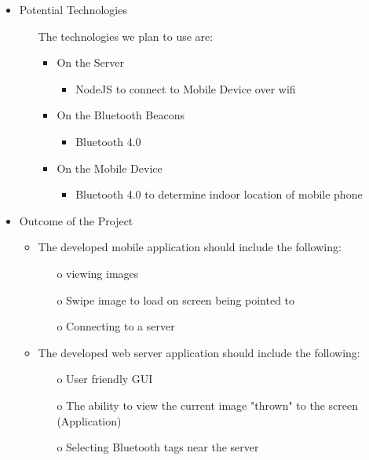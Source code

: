 \begin{itemize}
	\item Potential Technologies
	\begin{itemize}
		\item[] The technologies we plan to use are:
		\begin{itemize}
			\item On the Server
			\begin{itemize}
				\item NodeJS to connect to Mobile Device over wifi
			\end{itemize}
			\item On the Bluetooth Beacons
			\begin{itemize}
				\item Bluetooth 4.0 
			\end{itemize}
			\item On the Mobile Device
			\begin{itemize}
				\item Bluetooth 4.0 to determine indoor location of mobile phone
				
			\end{itemize}
		\end{itemize}
	\end{itemize}
	
	\item Outcome of the Project
	\begin{itemize}
		\item The developed mobile application should include the following:
		\begin{itemize}
			\item[o] viewing images
			\item[o] Swipe image to load on screen being pointed to
			\item[o] Connecting to a server
			
		\end{itemize}
		
		\item The developed web server application should include the following:
		\begin{itemize}
			\item [o] User friendly GUI
			\item [o] The ability to view the current image "thrown" to the screen (Application)
			\item[o] Selecting Bluetooth tags near the server
		\end{itemize}
	\end{itemize}
	
\end{itemize}
